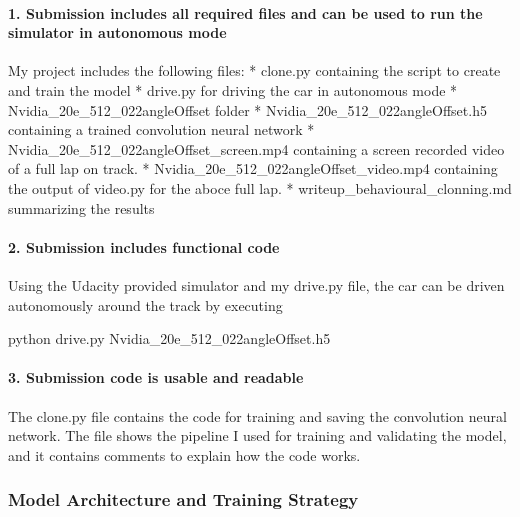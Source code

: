 \documentclass[11pt]{article}
\newenvironment{Shaded}{}{}
\newcommand{\NormalTok}[1]{{#1}}
\newcommand{\ExtensionTok}[1]{{#1}}
\begin{document}
\hypertarget{submission-includes-all-required-files-and-can-be-used-to-run-the-simulator-in-autonomous-mode}{%
\paragraph{1. Submission includes all required files and can be used to
run the simulator in autonomous
mode}\label{submission-includes-all-required-files-and-can-be-used-to-run-the-simulator-in-autonomous-mode}}

My project includes the following files: * clone.py containing the
script to create and train the model * drive.py for driving the car in
autonomous mode * Nvidia\_20e\_512\_022angleOffset folder *
Nvidia\_20e\_512\_022angleOffset.h5 containing a trained convolution
neural network * Nvidia\_20e\_512\_022angleOffset\_screen.mp4 containing
a screen recorded video of a full lap on track. *
Nvidia\_20e\_512\_022angleOffset\_video.mp4 containing the output of
video.py for the aboce full lap. * writeup\_behavioural\_clonning.md
summarizing the results

\hypertarget{submission-includes-functional-code}{%
\paragraph{2. Submission includes functional
code}\label{submission-includes-functional-code}}

Using the Udacity provided simulator and my drive.py file, the car can
be driven autonomously around the track by executing

\begin{Shaded}
\begin{Highlighting}[]
\ExtensionTok{python}\NormalTok{ drive.py Nvidia_20e_512_022angleOffset.h5}
\end{Highlighting}
\end{Shaded}

\hypertarget{submission-code-is-usable-and-readable}{%
\paragraph{3. Submission code is usable and
readable}\label{submission-code-is-usable-and-readable}}

The clone.py file contains the code for training and saving the
convolution neural network. The file shows the pipeline I used for
training and validating the model, and it contains comments to explain
how the code works.

\hypertarget{model-architecture-and-training-strategy}{%
\subsubsection{Model Architecture and Training
Strategy}\label{model-architecture-and-training-strategy}}
\end{document}
